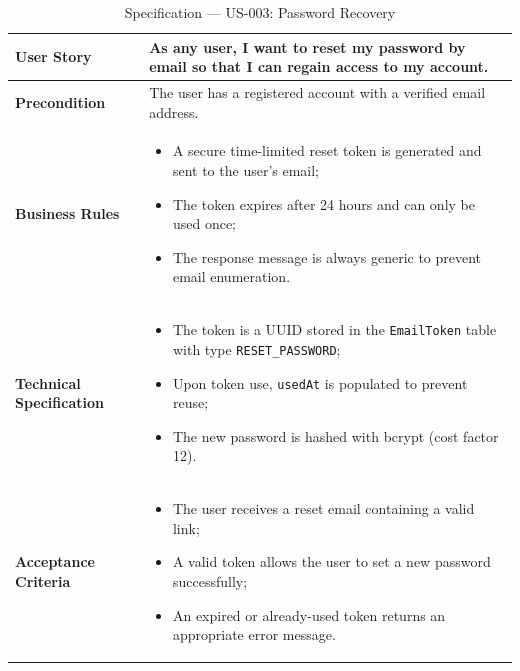 \begin{table}[H]
\centering
\caption{Specification — US-003: Password Recovery}
\label{tab:us003}
\renewcommand{\arraystretch}{1}
\begin{tabularx}{\textwidth}{|p{2.5cm}|X|}
\hline
\textbf{User Story} & As any user, I want to reset my password by email so that I can regain access to my account. \\
\hline
\textbf{Precondition} & The user has a registered account with a verified email address. \\
\hline
\textbf{Business Rules} &
\begin{itemize}
  \item A secure time-limited reset token is generated and sent to the user's email;
  \item The token expires after 24 hours and can only be used once;
  \item The response message is always generic to prevent email enumeration.
\end{itemize} \\
\hline
\textbf{Technical Specification} &
\begin{itemize}
  \item The token is a UUID stored in the \texttt{EmailToken} table with type \texttt{RESET\_PASSWORD};
  \item Upon token use, \texttt{usedAt} is populated to prevent reuse;
  \item The new password is hashed with bcrypt (cost factor 12).
\end{itemize} \\
\hline
\textbf{Acceptance Criteria} &
\begin{itemize}
  \item The user receives a reset email containing a valid link;
  \item A valid token allows the user to set a new password successfully;
  \item An expired or already-used token returns an appropriate error message.
\end{itemize} \\
\hline
\end{tabularx}
\end{table}

